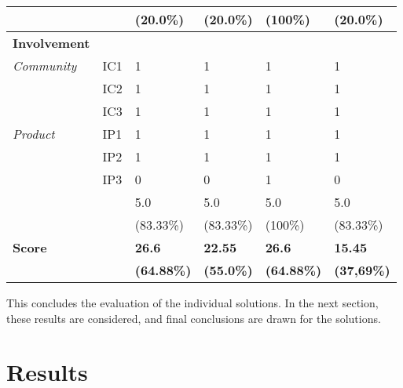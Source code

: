 \begin{longtable}{@{\extracolsep{\fill}}llllll@{}}
                               && (20.0\%) & (20.0\%) & (100\%) & (20.0\%) \\
                               \midrule
        \textbf{Involvement} &&&&&\\
        \textit{Community}     & IC1 & 1 & 1 & 1 & 1 \\
                               & IC2 & 1 & 1 & 1 & 1 \\                       
                               & IC3 & 1 & 1 & 1 & 1 \\                       
        \textit{Product}       & IP1 & 1 & 1 & 1 & 1 \\
                               & IP2 & 1 & 1 & 1 & 1 \\    
                               & IP3 & 0 & 0 & 1 & 0 \\
                               \hline
                               && 5.0 & 5.0 & 5.0 & 5.0 \\                        
                               && (83.33\%) & (83.33\%) & (100\%) & (83.33\%) \\
        \hline\hline
        \textbf{Score} & & \textbf{26.6} & \textbf{22.55} & \textbf{26.6} & \textbf{15.45} \\
        & & \textbf{(64.88\%)} & \textbf{(55.0\%)} & \textbf{(64.88\%)} & \textbf{(37,69\%)} \\
        \bottomrule
    \end{longtable}
    
    This concludes the evaluation of the individual solutions. In the next section, these results are considered, and final conclusions are drawn for the solutions.
    
	\section{Results}
	
	
	
	